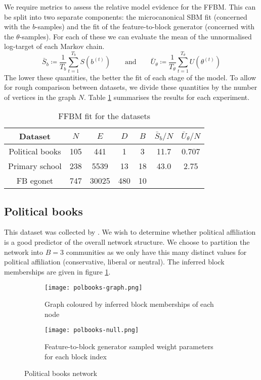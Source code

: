 We require metrics to assess the relative model evidence for the FFBM. This can be split into two separate components: the microcanonical SBM fit (concerned with the $b$-samples) and the fit of the feature-to-block generator (concerned with the $\theta$-samples). For each of these we can evaluate the mean of the unnormalised log-target of each Markov chain.
%
\begin{equation}
	\bar{S}_b \coloneqq \frac{1}{T_b} \sum_{t=1}^{T_b} S \left( b^{(t)} \right) \qquad \textrm{and} \qquad
	\bar{U}_\theta \coloneqq \frac{1}{T_\theta} \sum_{t=1}^{T_\theta} U \left( \theta^{(t)} \right)
\end{equation}
%
The lower these quantities, the better the fit of each stage of the model. To allow for rough comparison between datasets, we divide these quantities by the number of vertices in the graph $N$. Table \ref{tab:results} summarises the results for each experiment.

\begin{table}[!h]
	\centering
	\caption{FFBM fit for the datasets}
	\label{tab:results}
	\begin{tabular}{c|ccc|c|cc}
		Dataset & $N$ & $E$ & $D$ & $B$ & $\bar{S}_b /N$ & $\bar{U}_\theta /N$ \\ \hline
		Political books & 105  & 441 & 1 & 3 & 11.7 & 0.707 \\
		Primary school & 238 & 5539 & 13 &  18 & 43.0  & 2.75 \\
		FB egonet & 747 & 30025 & 480 & 10  &           &             \\
		       
	\end{tabular}
\end{table}


\subsection{Political books}

This dataset was collected by \citet{polbooks}. We wish to determine whether political affiliation is a good predictor of the overall network structure. We choose to partition the network into $B=3$ communities as we only have this many distinct values for political affiliation (conservative, liberal or neutral). The inferred block memberships are given in figure \ref{fig:books-graph}.

\begin{figure}[!h]
	\centering
	\begin{subfigure}{0.3\linewidth}
		\centering
		\texttt{[image: polbooks-graph.png]}
		\caption{Graph coloured by inferred block memberships of each node}
		\label{fig:books-graph}
	\end{subfigure}
	\hfill
	\begin{subfigure}{0.5\linewidth}
		\centering
		\texttt{[image: polbooks-null.png]}
		\caption{Feature-to-block generator sampled weight parameters for each block index}
		\label{fig:book-null}
	\end{subfigure}
	\caption{Political books network}
\end{figure}

